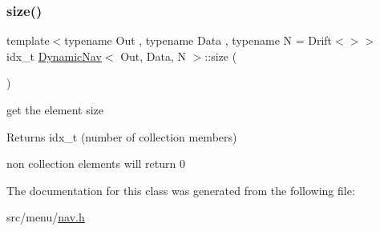 \subsubsection{\texorpdfstring{size()}{size()}}
{\footnotesize\ttfamily template$<$typename Out , typename Data , typename N  = Drift$<$$>$$>$ \\
idx\+\_\+t \hyperlink{classDynamicNav}{Dynamic\+Nav}$<$ Out, Data, N $>$\+::size (\begin{DoxyParamCaption}{ }\end{DoxyParamCaption})\hspace{0.3cm}{\ttfamily [inline]}}



get the element size 

\begin{DoxyReturn}{Returns}
idx\+\_\+t (number of collection members)
\end{DoxyReturn}
non collection elements will return 0 

The documentation for this class was generated from the following file\+:\begin{DoxyCompactItemize}
\item 
src/menu/\hyperlink{nav_8h}{nav.\+h}\end{DoxyCompactItemize}
